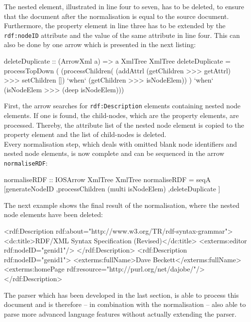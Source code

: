 \documentclass[11pt,a4paper,headsepline, bibtotoc]{scrreprt}
\begin{document}
The nested element, illustrated in line four to seven, has to be deleted, to ensure that the document after the normalisation is equal to the source document. Furthermore, the property element in line three has to be extended by the \texttt{rdf:nodeID} attribute and the value of the same attribute in line four. This can also be done by one arrow which is presented in the next listing:
\begin{code}[basicstyle=\ttfamily\small]
deleteDuplicate :: (ArrowXml a) => a XmlTree XmlTree
deleteDuplicate 
  = processTopDown (
     (processChildren( 
       (addAttrl (getChildren >>> getAttrl) >>> setChildren []) 
       `when` 
       (getChildren >>> isNodeElem))
     )
     `when` 
     (isNodeElem >>> (deep isNodeElem)))
\end{code}
First, the arrow searches for \texttt{rdf:Description} elements containing nested node elements. If one is found, the child-nodes, which are the property elements, are processed. Thereby, the attribute list of the nested node element is copied to the property element and the list of child-nodes is deleted.\\
Every normalisation step, which deals with omitted blank node identifiers and nested node elements, is now complete and can be sequenced in the arrow \texttt{normaliseRDF}:
\begin{code}
normaliseRDF :: IOSArrow XmlTree XmlTree
normaliseRDF = seqA [generateNodeID
                    ,processChildren (multi isNodeElem)
                    ,deleteDuplicate
                    ]
\end{code}
The next example shows the final result of the normalisation, where the nested node elements have been deleted:
\begin{xmlnb}[caption={Final Result of Normalisation},label={final}]
<rdf:Description rdf:about="http://www.w3.org/TR/rdf-syntax-grammar">
  <dc:title>RDF/XML Syntax Specification (Revised)</dc:title>
  <exterms:editor rdf:nodeID="genid1"/>
</rdf:Description>
<rdf:Description rdf:nodeID="genid1">
  <exterms:fullName>Dave Beckett</exterms:fullName>
  <exterms:homePage rdf:resource="http://purl.org/net/dajobe/"/>
</rdf:Description>
\end{xmlnb}
The parser which has been developed in the last section, is able to process this document and is therefore -- in combination with the normalisation -- also able to parse more advanced language features without actually extending the parser.
\end{document}
